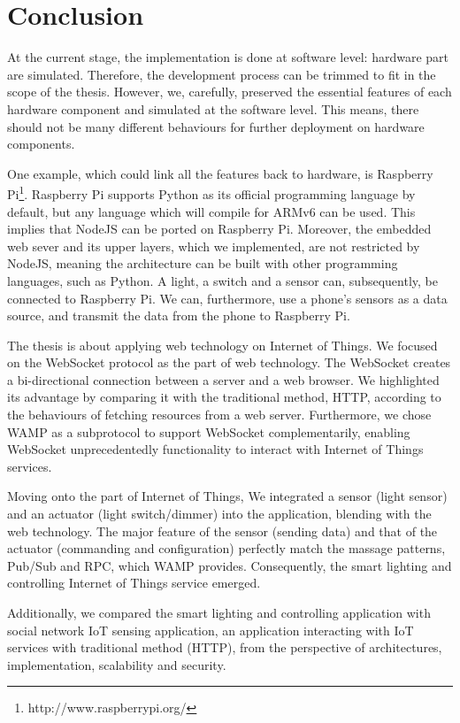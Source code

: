 \chapter{Conclusion}
\label{chapter:conclusion}

At the current stage, the implementation is done at software level: hardware part are simulated. Therefore, the development process can be trimmed to fit in the scope of the thesis. However, we, carefully, preserved the essential features of each hardware component and simulated at the software level. This means, there should not be many different behaviours for further deployment on hardware components. 

One example, which could link all the features back to hardware, is Raspberry Pi\footnote{http://www.raspberrypi.org/}. Raspberry Pi supports Python as its official programming language by default, but any language which will compile for ARMv6 can be used. This implies that NodeJS can be ported on Raspberry Pi. Moreover, the embedded web sever and its upper layers, which we implemented, are not restricted by NodeJS, meaning the architecture can be built with other programming languages, such as Python. A light, a switch and a sensor can, subsequently, be connected to Raspberry Pi. We can, furthermore, use a phone's sensors as a data source, and transmit the data from the phone to Raspberry Pi.

The thesis is about applying web technology on Internet of Things. We focused on the WebSocket protocol as the part of web technology. The WebSocket creates a bi-directional connection between a server and a web browser. We highlighted its advantage by comparing it with the traditional method, HTTP, according to the behaviours of fetching resources from a web server. Furthermore, we chose WAMP as a subprotocol to support WebSocket complementarily, enabling WebSocket unprecedentedly functionality to interact with Internet of Things services. 

Moving onto the part of Internet of Things, We integrated a sensor (light sensor) and an actuator (light switch/dimmer) into the application, blending with the web technology. The major feature of the sensor (sending data) and that of the actuator (commanding and configuration) perfectly match the massage patterns, Pub/Sub and RPC, which WAMP provides. Consequently, the smart lighting and controlling Internet of Things service emerged. 

Additionally, we compared the smart lighting and controlling application with social network IoT sensing application, an application interacting with IoT services with traditional method (HTTP), from the perspective of architectures, implementation, scalability and security. 

